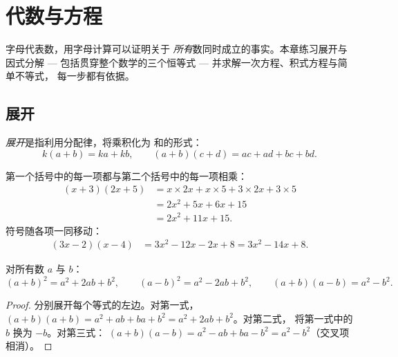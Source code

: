 \chapter{代数与方程}\label{ch:g9:algebra}

字母代表数，用字母计算可以证明关于
\emph{所有}数同时成立的事实。本章练习展开与
因式分解 --- 包括贯穿整个数学的三个恒等式 ---
并求解一次方程、积式方程与简单不等式，
每一步都有依据。

\section{展开}

\begin{definition}[展开]\label{def:g9:algebra:expand}
\emph{展开}是指利用分配律，将乘积化为
和的形式：
\[
k(a + b) = ka + kb,
\qquad
(a + b)(c + d) = ac + ad + bc + bd .
\]
\end{definition}

\begin{example}\label{ex:g9:algebra:expand}
第一个括号中的每一项都与第二个括号中的每一项相乘：
\begin{align*}
(x + 3)(2x + 5)
&= x \times 2x + x \times 5 + 3 \times 2x + 3 \times 5 \\
&= 2x^2 + 5x + 6x + 15 \\
&= 2x^2 + 11x + 15 .
\end{align*}
符号随各项一同移动：
\begin{align*}
(3x - 2)(x - 4)
&= 3x^2 - 12x - 2x + 8
= 3x^2 - 14x + 8 .
\end{align*}
\end{example}

\begin{theorem}[三个恒等式]\label{thm:g9:algebra:identities}
对所有数 $a$ 与 $b$：
\[
(a+b)^2 = a^2 + 2ab + b^2,
\qquad
(a-b)^2 = a^2 - 2ab + b^2,
\qquad
(a+b)(a-b) = a^2 - b^2 .
\]
\end{theorem}

\begin{proof}
分别展开每个等式的左边。对第一式，
$(a+b)(a+b) = a^2 + ab + ba + b^2 = a^2 + 2ab + b^2$。对第二式，
将第一式中的 $b$ 换为 $-b$。对第三式：
$(a+b)(a-b) = a^2 - ab + ba - b^2 = a^2 - b^2$（交叉项相消）。
\end{proof}


